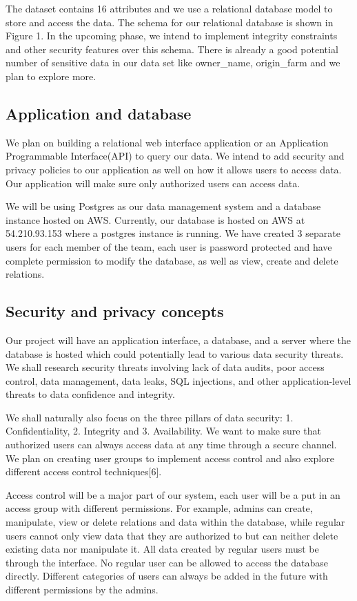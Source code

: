 \documentclass[sigconf]{acmart}
\begin{document}
The dataset contains 16 attributes and we use a relational database model to store and access the data. The schema for our relational database is shown in Figure 1. In the upcoming phase, we intend to implement integrity constraints and other security features over this schema. There is already a good potential number of sensitive data in our data set like owner\_name, origin\_farm and we plan to explore more. 

\subsection{Application and database}
We plan on building a relational web interface application or an Application Programmable Interface(API) to query our data. We intend to add security and privacy policies to our application as well on how it allows users to access data. Our application will make sure only authorized users can access data. 

We will be using Postgres as our data management system and a database instance hosted on AWS. Currently, our database is hosted on AWS at 54.210.93.153 where a postgres instance is running. We have created 3 separate users for each member of the team, each user is password protected and have complete permission to modify the database, as well as view, create and delete relations. 

\subsection{Security and privacy concepts}
Our project will have an application interface, a database, and a server where the database is hosted which could potentially lead to various data security threats. We shall research security threats involving lack of data audits, poor access control, data management, data leaks, SQL injections, and other application-level threats to data confidence and integrity. 

We shall naturally also focus on the three pillars of data security: 1. Confidentiality, 2. Integrity and 3. Availability. We want to make sure that authorized users can always access data at any time through a secure channel. We plan on creating user groups to implement access control and also explore different access control techniques[6]. 

Access control will be a major part of our system, each user will be a put in an access group with different permissions. For example, admins can create, manipulate, view or delete relations and data within the database, while regular users cannot only view data that they are authorized to but can neither delete existing data nor manipulate it. All data created by regular users must be through the interface. No regular user can be allowed to access the database directly. Different categories of users can always be added in the future with different permissions by the admins. 
\end{document}

